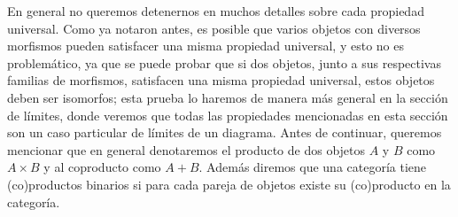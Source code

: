 \documentclass{comunicaciones}
\begin{document}
En general no queremos detenernos en muchos detalles sobre cada propiedad universal. Como ya notaron antes, es posible que varios objetos con diversos morfismos
pueden satisfacer una misma propiedad universal, y esto no es problemático, ya que se puede probar que si dos objetos, junto a sus respectivas familias de morfismos,
satisfacen una misma propiedad universal, estos objetos deben ser isomorfos; esta prueba lo haremos de manera más general en la sección de límites, donde veremos
que todas las propiedades mencionadas en esta sección son un caso particular de límites de un diagrama. Antes de continuar, queremos mencionar que en general
denotaremos el producto de dos objetos $A$ y $B$ como $A\times B$ y al coproducto como $A+B$. Además diremos que una categoría tiene (co)productos binarios
si para cada pareja de objetos existe su (co)producto en la categoría.
\end{document}
